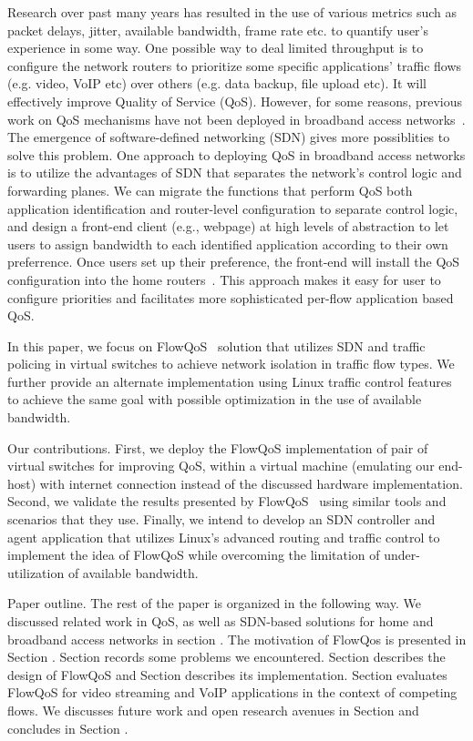 Research over past many years has resulted in the use of various metrics such as packet delays, jitter, available bandwidth, frame rate etc. to quantify user’s experience in some way. One possible way to deal limited throughput is to configure the network routers to prioritize some specific applications' traffic flows (e.g. video, VoIP etc) over others (e.g. data backup, file upload etc). It will effectively improve Quality of Service (QoS). However, for some reasons, previous work on QoS mechanisms have not been deployed in broadband access networks~\cite{Seddiki2014}. The emergence of software-defined networking (SDN) gives more possiblities to solve this problem. One approach to deploying QoS in broadband access networks is to utilize the advantages of SDN that separates the network's control logic and forwarding planes. We can migrate the functions that perform QoS both application identification and router-level configuration to separate control logic, and design a front-end client (e.g., webpage) at high levels of abstraction to let users to assign bandwidth to each identified application according to their own preferrence. Once users set up their preference, the front-end will install the QoS configuration into the home routers~\cite{Seddiki2014}. This approach makes it easy for user to configure priorities and facilitates more sophisticated per-flow application based QoS. 

In this paper, we focus on FlowQoS~\cite{Seddiki2014} solution that utilizes SDN and traffic policing in virtual switches to achieve network isolation in traffic flow types. We further provide an alternate implementation using Linux traffic control features to achieve the same goal with possible optimization in the use of available bandwidth.

Our contributions. First, we deploy the FlowQoS implementation of pair of virtual switches for improving QoS, within a virtual machine (emulating our end-host) with internet connection instead of the discussed hardware implementation. Second, we validate the results presented by FlowQoS~\cite{Seddiki2014} using similar tools and scenarios that they use. Finally, we intend to develop an SDN controller and agent application that utilizes Linux’s advanced routing and traffic control to implement the idea of FlowQoS while overcoming the limitation of under-utilization of available bandwidth. 

Paper outline. The rest of the paper is organized in the following way. We discussed related work in QoS, as well as SDN-based solutions for home and broadband access networks in section . The motivation of FlowQos is presented in Section . Section  records some problems we encountered. Section  describes the design of FlowQoS and Section  describes its implementation. Section  evaluates FlowQoS for video streaming and VoIP applications in the context of competing flows. We discusses future work and open research avenues in Section  and concludes in Section .


